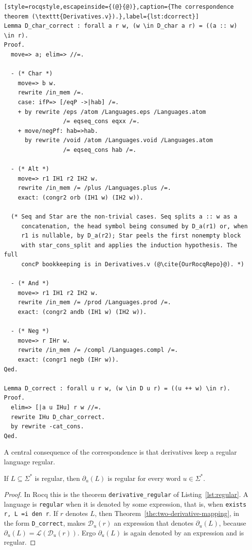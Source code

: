 \begin{lstlisting}[style=rocqstyle,escapeinside={(@}{@)},caption={The correspondence theorem (\texttt{Derivatives.v}).},label={lst:dcorrect}]
Lemma D_char_correct : forall a r w, (w \in D_char a r) = ((a :: w) \in r).
Proof.
  move=> a; elim=> //=.

  - (* Char *)
    move=> b w.
    rewrite /in_mem /=.
    case: ifP=> [/eqP ->|hab] /=.
    + by rewrite /eps /atom /Languages.eps /Languages.atom
                 /= eqseq_cons eqxx /=.
    + move/negPf: hab=>hab.
      by rewrite /void /atom /Languages.void /Languages.atom
                 /= eqseq_cons hab /=.

  - (* Alt *)
    move=> r1 IH1 r2 IH2 w.
    rewrite /in_mem /= /plus /Languages.plus /=.
    exact: (congr2 orb (IH1 w) (IH2 w)).

  (* Seq and Star are the non-trivial cases. Seq splits a :: w as a
     concatenation, the head symbol being consumed by D_a(r1) or, when
     r1 is nullable, by D_a(r2); Star peels the first nonempty block
     with star_cons_split and applies the induction hypothesis. The full
     concP bookkeeping is in Derivatives.v (@\cite{OurRocqRepo}@). *)

  - (* And *)
    move=> r1 IH1 r2 IH2 w.
    rewrite /in_mem /= /prod /Languages.prod /=.
    exact: (congr2 andb (IH1 w) (IH2 w)).

  - (* Neg *)
    move=> r IHr w.
    rewrite /in_mem /= /compl /Languages.compl /=.
    exact: (congr1 negb (IHr w)).
Qed.

Lemma D_correct : forall u r w, (w \in D u r) = ((u ++ w) \in r).
Proof.
  elim=> [|a u IHu] r w //=.
  rewrite IHu D_char_correct.
  by rewrite -cat_cons.
Qed.
\end{lstlisting}

A central consequence of the correspondence is that derivatives keep a regular
language regular.

\begin{theorem}\label{the:language-derivative-regular}
If $L\subseteq\Sigma^{*}$ is regular, then $\partial_u(L)$ is regular for every
word $u\in\Sigma^{*}$.
\end{theorem}

\begin{proof}
In Rocq this is the theorem \texttt{derivative\_regular} of
Listing~\ref{lst:regular}. A language is \texttt{regular} when it is denoted by
some expression, that is, when \texttt{exists r, L =i den r}. If $r$ denotes $L$,
then Theorem~\ref{the:two-derivative-mapping}, in the form \texttt{D\_correct},
makes $\mathcal{D}_u(r)$ an expression that denotes $\partial_u(L)$, because
$\partial_u(L)=\mathcal{L}(\mathcal{D}_u(r))$. Ergo $\partial_u(L)$ is again
denoted by an expression and is regular.
\end{proof}

